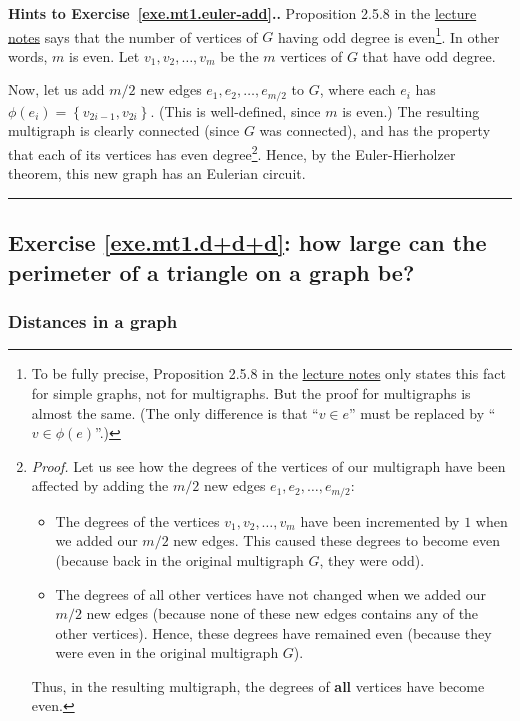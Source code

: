 \documentclass[numbers=enddot,12pt,final,onecolumn,notitlepage]{scrartcl}%
\theoremstyle{definition}
\newenvironment{proof}[1][Proof]{\noindent\textbf{#1.} }{\ \rule{0.5em}{0.5em}}
\newcommand{\set}[1]{\left\{ #1 \right\}}
\newcommand{\tup}[1]{\left( #1 \right)}
\begin{document}
\begin{proof}[Hints to Exercise~\ref{exe.mt1.euler-add}.]
Proposition 2.5.8 in the
\href{http://www-users.math.umn.edu/~dgrinber/5707s17/nogra.pdf}{lecture notes}
says that the number of vertices of $G$ having odd degree is
even\footnote{To be fully precise, Proposition 2.5.8 in the
\href{http://www-users.math.umn.edu/~dgrinber/5707s17/nogra.pdf}{lecture notes}
only states this fact for simple graphs, not for multigraphs. But the
proof for multigraphs is almost the same. (The only difference is that
``$v \in e$'' must be replaced by ``$v \in \phi\tup{e}$''.)}.
In other words, $m$ is even. Let $v_1, v_2, \ldots, v_m$ be the $m$
vertices of $G$ that have odd degree.

Now, let us add $m/2$ new edges
$e_1, e_2, \ldots, e_{m/2}$ to $G$, where each $e_i$ has
$\phi\tup{e_i} = \set{v_{2i-1}, v_{2i}}$.
(This is well-defined, since $m$ is even.) The resulting multigraph is
clearly connected (since $G$ was connected), and has the property that
each of its vertices has even degree\footnote{\textit{Proof.}
Let us see how the degrees of the vertices of our multigraph have been
affected by adding the $m/2$ new edges $e_1, e_2, \ldots, e_{m/2}$:
\begin{itemize}
\item The degrees of the vertices $v_1, v_2, \ldots, v_m$ have been
      incremented by $1$ when we added our $m/2$ new edges. This
      caused these degrees to become even (because back in the
      original multigraph $G$, they were odd).
\item The degrees of all other vertices have not changed when we added
      our $m/2$ new edges (because none of these new edges contains
      any of the other vertices). Hence, these degrees have remained
      even (because they were even in the original multigraph $G$).
\end{itemize}
Thus, in the resulting multigraph, the degrees of \textbf{all}
vertices have become even.}.
Hence, by the Euler-Hierholzer theorem, this new graph has an Eulerian
circuit.
\end{proof}

\subsection{Exercise \ref{exe.mt1.d+d+d}: how large can the perimeter
of a triangle on a graph be?}

\subsubsection{Distances in a graph}
\end{document}
